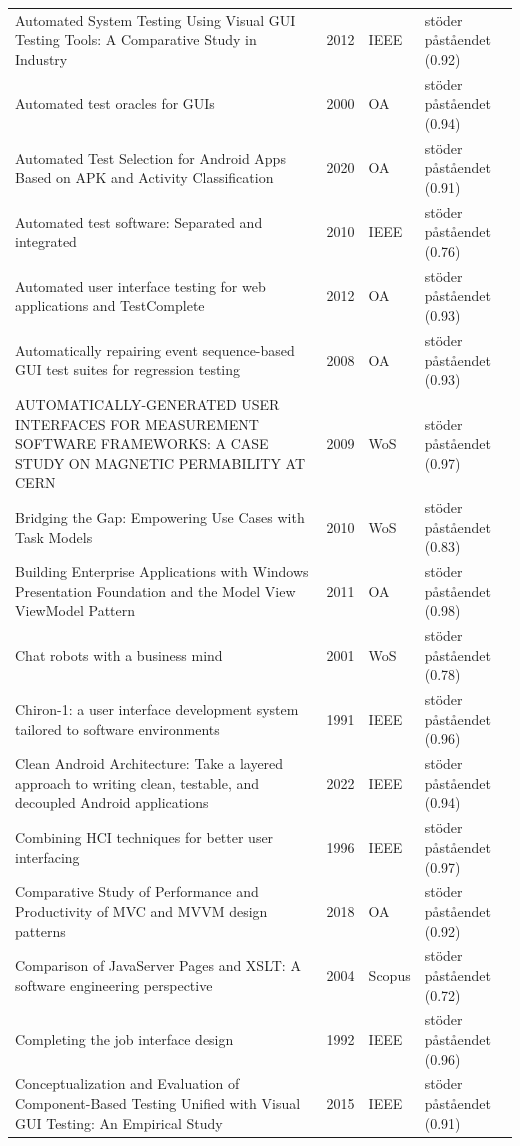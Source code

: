 \begin{longtable}{@{}%
  >{\raggedright\arraybackslash}p{}c%
  >{\raggedright\arraybackslash}p{}%
  >{\raggedright\arraybackslash}p{}@{}}
Automated System Testing Using Visual GUI Testing Tools: A Comparative Study in Industry & 2012 & IEEE & stöder påståendet (0.92) \\
Automated test oracles for GUIs & 2000 & OA & stöder påståendet (0.94) \\
Automated Test Selection for Android Apps Based on APK and Activity Classification & 2020 & OA & stöder påståendet (0.91) \\
Automated test software: Separated and integrated & 2010 & IEEE & stöder påståendet (0.76) \\
Automated user interface testing for web applications and TestComplete & 2012 & OA & stöder påståendet (0.93) \\
Automatically repairing event sequence-based GUI test suites for regression testing & 2008 & OA & stöder påståendet (0.93) \\
AUTOMATICALLY-GENERATED USER INTERFACES FOR MEASUREMENT SOFTWARE FRAMEWORKS: A CASE STUDY ON MAGNETIC PERMABILITY AT CERN & 2009 & WoS & stöder påståendet (0.97) \\
Bridging the Gap: Empowering Use Cases with Task Models & 2010 & WoS & stöder påståendet (0.83) \\
Building Enterprise Applications with Windows Presentation Foundation and the Model View ViewModel Pattern & 2011 & OA & stöder påståendet (0.98) \\
Chat robots with a business mind & 2001 & WoS & stöder påståendet (0.78) \\
Chiron-1: a user interface development system tailored to software environments & 1991 & IEEE & stöder påståendet (0.96) \\
Clean Android Architecture: Take a layered approach to writing clean, testable, and decoupled Android applications & 2022 & IEEE & stöder påståendet (0.94) \\
Combining HCI techniques for better user interfacing & 1996 & IEEE & stöder påståendet (0.97) \\
Comparative Study of Performance and Productivity of MVC and MVVM design patterns & 2018 & OA & stöder påståendet (0.92) \\
Comparison of JavaServer Pages and XSLT: A software engineering perspective & 2004 & Scopus & stöder påståendet (0.72) \\
Completing the job interface design & 1992 & IEEE & stöder påståendet (0.96) \\
Conceptualization and Evaluation of Component-Based Testing Unified with Visual GUI Testing: An Empirical Study & 2015 & IEEE & stöder påståendet (0.91) \\

\end{longtable}
